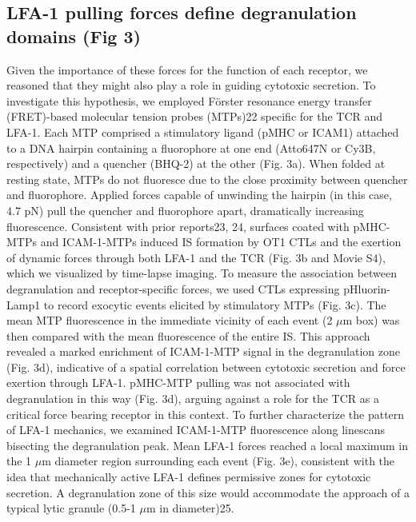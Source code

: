\subsection{LFA-1 pulling forces define degranulation domains (Fig 3)}
Given the importance of these forces for the function of each receptor, we reasoned that they might also play a role in guiding cytotoxic secretion. To investigate this hypothesis, we employed F\"{o}rster resonance energy transfer (FRET)-based molecular tension probes (MTPs)22 specific for the TCR and LFA-1. Each MTP comprised a stimulatory ligand (pMHC or ICAM1) attached to a DNA hairpin containing a fluorophore at one end (Atto647N or Cy3B, respectively) and a quencher (BHQ-2) at the other (Fig. 3a). When folded at resting state, MTPs do not fluoresce due to the close proximity between quencher and fluorophore. Applied forces capable of unwinding the hairpin (in this case, 4.7 pN) pull the quencher and fluorophore apart, dramatically increasing fluorescence. Consistent with prior reports23, 24, surfaces coated with pMHC-MTPs and ICAM-1-MTPs induced IS formation by OT1 CTLs and the exertion of dynamic forces through both LFA-1 and the TCR (Fig. 3b and Movie S4), which we visualized by time-lapse imaging. To measure the association between degranulation and receptor-specific forces, we used CTLs expressing pHluorin-Lamp1 to record exocytic events elicited by stimulatory MTPs (Fig. 3c). The mean MTP fluorescence in the immediate vicinity of each event (2 $\mu$m box) was then compared with the mean fluorescence of the entire IS. This approach revealed a marked enrichment of ICAM-1-MTP signal in the degranulation zone (Fig. 3d), indicative of a spatial correlation between cytotoxic secretion and force exertion through LFA-1. pMHC-MTP pulling was not associated with degranulation in this way (Fig. 3d), arguing against a role for the TCR as a critical force bearing receptor in this context. To further characterize the pattern of LFA-1 mechanics, we examined ICAM-1-MTP fluorescence along linescans bisecting the degranulation peak. Mean LFA-1 forces reached a local maximum in the 1 $\mu$m diameter region surrounding each event (Fig. 3e), consistent with the idea that mechanically active LFA-1 defines permissive zones for cytotoxic secretion. A degranulation zone of this size would accommodate the approach of a typical lytic granule (0.5-1 $\mu$m in diameter)25. 

